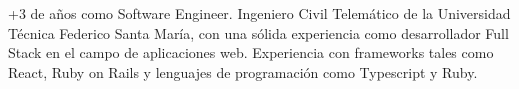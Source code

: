 

\begin{cvparagraph}
  +3 de años como Software Engineer. Ingeniero Civil Telemático de la Universidad Técnica Federico Santa María,
  con una sólida experiencia como desarrollador Full Stack en el campo de aplicaciones web. 
  Experiencia con frameworks tales como React, Ruby on Rails y lenguajes de programación como Typescript y Ruby.
\end{cvparagraph}
